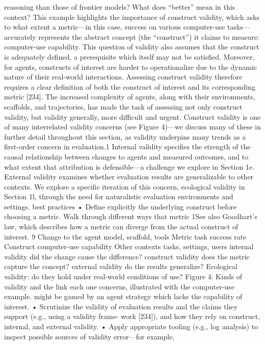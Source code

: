 reasoning than those of frontier models? What does “better” mean in this context?
This example highlights the importance of construct validity, which asks to what extent a metric—in this
case, success on various computer-use tasks—accurately represents the abstract concept (the “construct”)
it claims to measure: computer-use capability. This question of validity also assumes that the construct is
adequately defined, a prerequisite which itself may not be satisfied. Moreover, for agents, constructs of
interest are harder to operationalize due to the dynamic nature of their real-world interactions. Assessing
construct validity therefore requires a clear definition of both the construct of interest and its corresponding
metric [234].
The increased complexity of agents, along with their environments, scaffolds, and trajectories, has made
the task of assessing not only construct validity, but validity generally, more difficult and urgent. Construct
validity is one of many interrelated validity concerns (see Figure 4)—we discuss many of these in further
detail throughout this section, as validity underpins many trends as a first-order concern in evaluation.1
Internal validity specifies the strength of the causal relationship between changes to agents and measured
outcomes, and to what extent that attribution is defensible—a challenge we explore in Section 1e. External
validity examines whether evaluation results are generalizable to other contexts. We explore a specific
iteration of this concern, ecological validity in Section 1l, through the need for naturalistic evaluation
environments and settings.
best practices
• Define explicitly the underlying construct before choosing a metric. Walk through different ways that metric
1See also Goodhart’s law, which describes how a metric can diverge from the actual construct of interest.
9
Change to the agent
model, scaffold, tools
Metric
task success rate
Construct
computer-use capability
Other contexts
tasks, settings, users
internal validity
did the change
cause the difference?
construct validity
does the metric
capture the concept?
external validity
do the results generalize?
Ecological validity: do they hold under
real-world conditions of use?
Figure 4: Kinds of validity and the link each one concerns, illustrated with the computer-use example.
might be gamed by an agent strategy which lacks the capability of interest.
• Scrutinize the validity of evaluation results and the claims they support (e.g., using a validity frame-
work [234]), and how they rely on construct, internal, and external validity.
• Apply appropriate tooling (e.g., log analysis) to inspect possible sources of validity error—for example,

